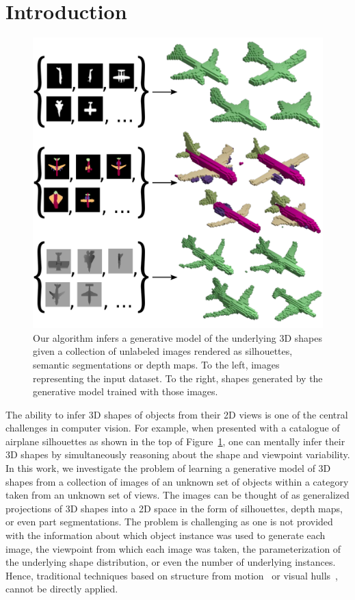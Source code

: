 \section{Introduction}\label{xs:intro}

\begin{figure}[t]
\centering
\includegraphics[width=1.0\linewidth]{fig/visabstract.pdf}
\caption{\label{f:problem} Our algorithm infers a generative model of
  the underlying 3D shapes given a collection of unlabeled images rendered as
  silhouettes, semantic segmentations or depth maps. 
	To the left, images representing the input dataset.
	To the right, shapes generated by the generative model trained with those images.}
\vspace{-12pt}
\end{figure}


The ability to infer 3D shapes of objects from their 2D views is one
of the central challenges in computer vision.
For example, when presented with a catalogue of airplane silhouettes
as shown in the top of Figure~\ref{f:problem}, one can mentally infer
their 3D shapes by simultaneously reasoning about the shape and
viewpoint variability.
In this work, we investigate the problem of learning a generative
model of 3D shapes from a collection of images of an unknown set of
objects within a category taken from an unknown set of views.
The images can be thought of as generalized projections of 3D shapes
into a 2D space in the form of silhouettes, depth maps,
or even part segmentations.
The problem is challenging as one is not provided with the information
about which object instance was used to generate each image, the viewpoint from
which each image was taken, the parameterization of the underlying shape
distribution, or even the number of underlying instances.
Hence, traditional techniques based on structure
from motion~\cite{hartley2003multiple,blanz1999morphable} or visual
hulls~\cite{laurentini1994visual}, cannot be directly applied.


